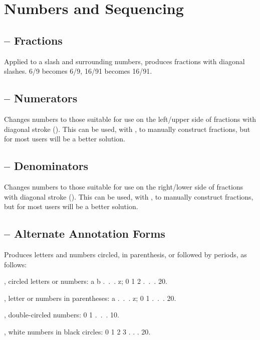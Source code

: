 \section{Numbers and Sequencing}
\subsection{ -- Fractions}
Applied to a slash and surrounding numbers, produces fractions with diagonal
slashes. 6/9 becomes {6/9}, 16/91 becomes {16/91}.

\subsection{ -- Numerators}
Changes numbers to those suitable for use on the left/upper side of fractions
with diagonal stroke (). This can be used, with , to manually construct
fractions, but for most users  will be a better solution.

\subsection{ -- Denominators}
Changes numbers to those suitable for use on the right/lower side of fractions
with diagonal stroke (). This can be used, with , to manually construct
fractions, but for most users  will be a better solution.

\subsection{ -- Alternate Annotation Forms}
Produces letters and numbers circled, in parenthesis, or followed by periods, as follows:

, circled letters or numbers: {a b .~.~. z; 0 1 2 .~.~. 20}.

, letter or numbers in parentheses: {a .~.~. z; 0 1 .~.~. 20}.

, double-circled numbers: {0 1 .~.~. 10}.

, white numbers in black circles: {0 1 2 3 . . . 20}.

